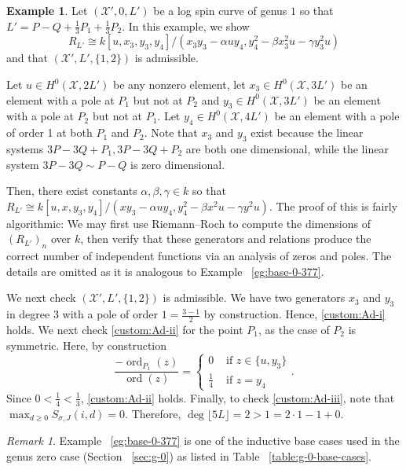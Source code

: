 \documentclass{amsart}
\theoremstyle{plain}
\theoremstyle{definition}
\newtheorem{example}[thm]{Example}
\theoremstyle{remark}
\newtheorem{rem}[thm]{Remark}
\numberwithin{equation}{section}
\DeclareMathOperator{\ord}{ord}
\newcommand\sx{\mathscr X}
\newcommand{\halfcan}{L}
\begin{document}
\begin{example}
\label{eg:base-1-33}
Let $(\sx',0 , \halfcan')$ be a log spin curve of genus $1$ so that $\halfcan' = P - Q + \frac{1}{3}P_1 + \frac{1}{3}P_2$. In this example, we show
$$R_{\halfcan'} \cong k[u, x_3, y_3, y_4]/(x_3 y_3- \alpha uy_4, y_4^2 - \beta x_3^2 u - \gamma y_3^2u)$$
and that $(\sx', \halfcan', \{1,2\})$ is admissible.

Let $u \in H^0(\sx,2\halfcan')$ be any nonzero element, let $x_3 \in H^0(\sx,3\halfcan')$ be an element with a pole at $P_1$ but not at $P_2$ and $y_3 \in H^0(\sx,3\halfcan')$ be an element with a pole at $P_2$ but not at $P_1$. Let $y_4 \in H^0(\sx,4\halfcan')$ be an element with a pole of order 1 at both $P_1$ and $P_2$. Note that $x_3$ and $y_3$ exist because the linear systems $3P - 3Q + P_1, 3P - 3Q + P_2$ are both one dimensional, while the linear system $3P - 3Q \sim P - Q$ is zero dimensional.

Then, there exist constants $\alpha, \beta, \gamma \in k$ so that 
$R_{\halfcan'} \cong k[u, x, y_3, y_4]/(xy_3- \alpha uy_4, y_4^2 - \beta x^2 u - \gamma y^2u).$ The proof of this is fairly algorithmic: We may first use Riemann--Roch to compute the dimensions of $(R_{\halfcan'})_n$ over $k$, then verify that these generators and relations produce the correct number of independent functions via an analysis of zeros and poles. The details are omitted as it is analogous to Example ~\ref{eg:base-0-377}.

We next check $(\sx', \halfcan', \{1,2\})$ is admissible. We have two generators $x_3$ and $y_3$ in degree 3 with a pole of order $1=\frac{3- 1}{2}$ by construction. Hence, \ref{custom:Ad-i} holds. We next check \ref{custom:Ad-ii} for the point $P_1$, as the case of $P_2$ is symmetric. Here, by construction
$$
\frac{-\ord_{P_1}(z)}{\ord(z)} = \begin{cases}
	0 &\text{ if }z \in \{u, y_3\}\\
	\frac{1}{4} &\text{ if }z = y_4
\end{cases}.$$
Since $0 < \frac{1}{4} < \frac{1}{3}$, \ref{custom:Ad-ii} holds.
Finally, to check \ref{custom:Ad-iii}, note that $\max_{d \geq 0}S_{\sigma,J}(i,d) = 0.$ Therefore, $\deg \lfloor 5L \rfloor  = 2 > 1 = 2 \cdot 1 - 1 + 0$.
\end{example}

\begin{rem}
\label{rem:base-0-377}
Example ~\ref{eg:base-0-377} is one of the inductive base cases
used in the genus zero case (Section ~\ref{sec:g-0}) as
listed in Table ~\ref{table:g-0-base-cases}.
\end{rem}
\end{document}
